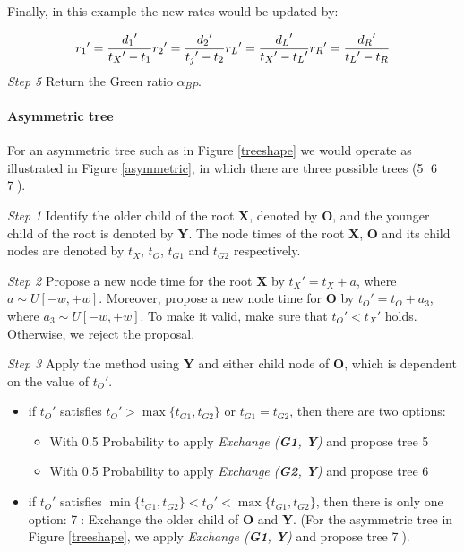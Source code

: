 \documentclass{bmcart}
\begin{document}
Finally, in this example the new rates would be updated by:

\begin{equation}\label{example1.2}
{r_1}' = \frac{{{d_1}'}}{{{t_X}' - {t_1}}} \\
{r_2}' = \frac{{{d_2}'}}{{{t_j}' - {t_2}}} \\
{r_L}' = \frac{{{d_L}'}}{{{t_X}' - {t_L}'}} \\
{r_R}' = \frac{{{d_R}'}}{{{t_L}' - {t_R}}} 
\end{equation}
\emph{Step 5} Return the Green ratio ${\alpha_{BP}}$.
\paragraph*{Asymmetric tree}

For an asymmetric tree such as in Figure \ref{treeshape} we would operate as illustrated in Figure \ref{asymmetric}, in which there are three possible trees (\textcircled5 \textcircled6 \textcircled7).

\emph{Step 1} Identify the older child of the root \textbf{X}, denoted by \textbf{O}, and the younger child of the root is denoted by \textbf{Y}. The node times of the root \textbf{X},  \textbf{O} and its child nodes are denoted by ${t_X}$, ${t_O}$, ${t_{G1}}$ and ${t_{G2}}$ respectively. 

\emph{Step 2} Propose a new node time for the root \textbf{X} by ${t_X}' = {t_X} + a$, where $a \sim U[ - w, + w]$. Moreover, propose a new node time for \textbf{O} by ${t_O}' = {t_O} + {a_3}$, where ${a_3} \sim U[ - w, + w]$. To make it valid, make sure that ${t_O}' < {t_X}'$ holds. Otherwise, we reject the proposal.  

\emph{Step 3} Apply the method using \textbf{Y} and either child node of \textbf{O}, which is dependent on the value of ${t_O}'$.
\begin{itemize}
\item if ${t_O}'$ satisfies ${t_O}' > \max \{ {t_{G1}},{t_{G2}}\} $ or ${t_{G1}} = {t_{G2}}$, then there are two options:

  \begin{itemize}
    \item With 0.5 Probability to apply \textit{Exchange (\textbf{G1}, \textbf{Y})} and propose tree \textcircled5

    \item With 0.5 Probability to apply \textit{Exchange (\textbf{G2}, \textbf{Y})} and propose tree \textcircled6
  \end{itemize}
\item if ${t_O}'$ satisfies $\min \{ {t_{G1}},{t_{G2}}\}  < {t_O}' < \max \{ {t_{G1}},{t_{G2}}\} $, then there is only one option: 
\textcircled7: Exchange the older child of \textbf{O} and \textbf{Y}. 
 (For the asymmetric tree in Figure \ref{treeshape}, we apply \textit{Exchange (\textbf{G1}, \textbf{Y})} and propose tree \textcircled7).
\end{itemize}
\end{document}
